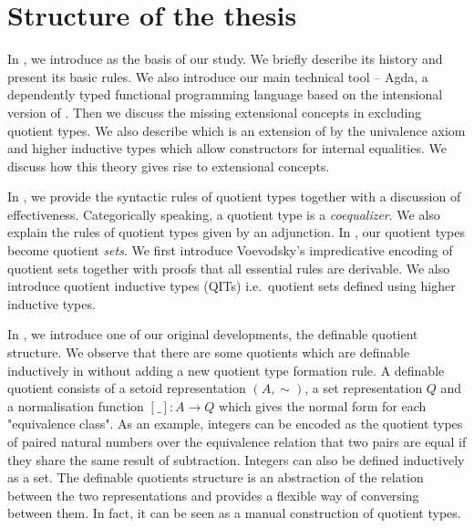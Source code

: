 \section{Structure of the thesis}



In , we introduce \mltt as the basis of our study. We briefly
describe its history and present its basic rules.  We also introduce
our main technical tool -- Agda, a dependently typed functional
programming language based on the intensional version of \mltt. Then
we discuss the missing extensional concepts in \itt excluding quotient
types. We also describe \hott which is an extension of \mltt by the
univalence axiom and higher inductive types which allow constructors
for internal equalities. We discuss how this theory gives rise to
extensional concepts.


In , we provide the syntactic rules of quotient types
together with a discussion of effectiveness. Categorically speaking, a
quotient type is a \emph{coequalizer}. We also explain the rules of
quotient types given by an adjunction. In \hott, our quotient types
become quotient \emph{sets}. We first introduce Voevodsky's
impredicative encoding of quotient sets together with proofs that all
essential rules are derivable. We also introduce quotient inductive
types (QITs) i.e.\ quotient sets defined using higher inductive types.
 

In , we introduce one of our original developments, the
definable quotient structure. We observe that there are some quotients
which are definable inductively in \mltt without adding a new quotient
type formation rule. A definable quotient consists of a setoid
representation $(A, \sim)$, a set representation $Q$ and a
normalisation function $[\_] : A \to Q$ which gives the normal form
for each "equivalence class".  As an example, integers can be encoded
as the quotient types of paired natural numbers over the equivalence
relation that two pairs are equal if they share the same result of
subtraction. Integers can also be defined inductively as a set. The
definable quotients structure is an abstraction of the relation
between the two representations and provides a flexible way of
conversing between them. In fact, it can be seen as a manual
construction of quotient types.


